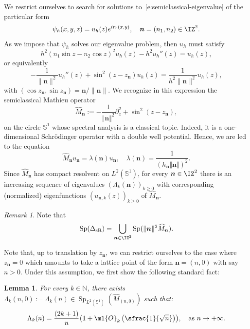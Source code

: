 \documentclass[JEP,XML,SOM,Unicode, NoEqCountersInSection,published]{cedram}
\theoremstyle{plain}
\newtheorem{lemm}[theo]{Lemma}
\theoremstyle{definition}
\theoremstyle{remark}
\newtheorem{rema}[theo]{Remark}
\begin{document}
We restrict ourselves to search for solutions to~\eqref{e:semiclassical-eigenvalue} of the particular form
\[
\psi_h(x,y,z)=u_h(z)e^{in \cdot (x,y)},\quad \boldsymbol{n}=(n_1,n_2)\in\IZ^2.
\]
As we impose that $\psi_h$ solves our eigenvalue problem, then $u_h$ must satisfy
\[
h^2(n_1\sin z-n_2\cos z)^2u_h(z)-h^2u_h''(z)=u_h(z),
\]
or equivalently
\[
-\frac{1}{\|\boldsymbol{n}\|^2}u_h''(z)+\sin^2(z-z_{\boldsymbol{n}})u_h(z)=\frac{1}{h^2\|\boldsymbol{n}\|^2}u_h(z),
\]
with $(\cos z_{\boldsymbol{n}},\sin z_{\boldsymbol{n}})=\boldsymbol{n}/\|\boldsymbol{n}\|$. We recognize in this expression the semiclassical Mathieu operator
\[
\widehat{M}_{\boldsymbol{n}} := - \frac{1}{\Vert \boldsymbol{n} \Vert^2} \partial_z^2 + \sin^2(z- z_{\boldsymbol{n}}),
\]
on the circle $\mathbb{S}^1$ whose spectral analysis is a classical topic. Indeed, it is a one-dimensional Schrödinger operator with a double well potential. Hence, we are led to the equation
\begin{equation}
\label{e:Mathieu_equation}
\widehat{M}_{\boldsymbol{n}} u_{\boldsymbol{n}} = \lambda(\boldsymbol{n}) u_{\boldsymbol{n}}, \quad \lambda(\boldsymbol{n}) = \frac{1}{(h_{\boldsymbol{n}} \Vert \boldsymbol{n} \Vert)^2}.
\end{equation}
Since $\widehat{M}_{\boldsymbol{n}}$ has compact resolvent on $L^2(\mathbb{S}^1)$, for every $\boldsymbol{n}\in\IZ^2$ there is an increasing sequence of eigenvalues $(\Lambda_k(\boldsymbol{n}))_{k\geq 0}$ with corresponding (normalized) eigenfunctions $(u_{\boldsymbol{n},k}(z))_{k\geq 0}$ of $\widehat{M}_{\boldsymbol{n}}$.
\begin{rema} Note that
\[
\operatorname{Sp}(\Delta_{\text{sR}})=\bigcup_{\boldsymbol{n}\in\IZ^2}\operatorname{Sp}(\|\boldsymbol{n}\|^2\widehat{M}_{\boldsymbol{n}}).
\]
\end{rema}

Note that, up to translation by $z_{\boldsymbol{n}}$, we can restrict ourselves to the case where $z_{\boldsymbol{n}}=0$ which amounts to take a lattice point of the form $\boldsymbol{n}=(n,0)$ with say $n>0$. Under this assumption, we first show the following standard fact:

\begin{lemm}
\label{l:quasimodes_for_mathieu}
For every $k \in \mathbb{N}$, there exists $\Lambda_k(n,0):=\Lambda_k(n) \in \operatorname{Sp}_{L^2(\mathbb{S}^1)}(\widehat{M}_{(n,0)})$ such that:
\begin{equation}
\label{e:eigenvalues_asymptic}
\Lambda_k(n) = \frac{(2k+1)}{ n } \bigl(1 + \ml{O}_k\left(\sfrac{1}{\sqrt{n}}\right) \bigr), \quad \text{as } n \to + \infty.
\end{equation}
\end{lemm}
\end{document}
